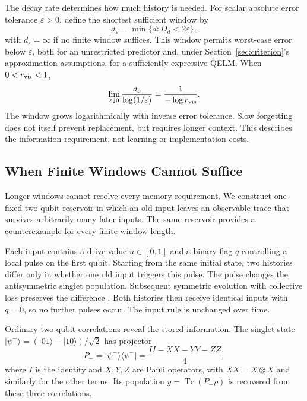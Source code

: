 The decay rate determines how much history is needed. For scalar absolute
error tolerance $\varepsilon>0$, define the shortest sufficient window by
\begin{equation}
 d_\varepsilon=\min\{d:D_d<2\varepsilon\},
 \label{eq:context-length}
\end{equation}
with $d_\varepsilon=\infty$ if no finite window suffices. This window permits
worst-case error below $\varepsilon$, both for an unrestricted predictor
and, under Section~\ref{sec:criterion}'s approximation assumptions, for a
sufficiently expressive QELM. When $0<r_{\rm vis}<1$,
\begin{equation}
 \lim_{\varepsilon\downarrow0}
 \frac{d_\varepsilon}{\log(1/\varepsilon)}
 =\frac{1}{-\log r_{\rm vis}}.
 \label{eq:window-complexity}
\end{equation}
The window grows logarithmically with inverse error tolerance. Slow
forgetting does not itself prevent replacement, but requires longer context.
This describes the information requirement, not learning or implementation
costs.

\subsection{When Finite Windows Cannot Suffice}

Longer windows cannot resolve every memory requirement. We construct one
fixed two-qubit reservoir in which an old input leaves an observable trace
that survives arbitrarily many later inputs. The same reservoir provides
a counterexample for every finite window length.

Each input contains a drive value $u\in[0,1]$ and a binary flag $q$ controlling
a local pulse on the first qubit. Starting from the same initial state,
two histories differ only in whether one old input triggers this pulse.
The pulse changes the antisymmetric singlet population. Subsequent symmetric
evolution with collective loss preserves the difference
\cite{zanardi1997noiseless}. Both histories then receive identical inputs
with $q=0$, so no further pulses occur. The input rule is unchanged over time.

Ordinary two-qubit correlations reveal the stored information. The singlet
state $|\psi^-\rangle=(|01\rangle-|10\rangle)/\sqrt2$ has projector
\begin{equation}
 P_-=|\psi^-\rangle\!\langle\psi^-|
 =\frac{II-XX-YY-ZZ}{4},
 \label{eq:protected-singlet}
\end{equation}
where $I$ is the identity and $X,Y,Z$ are Pauli operators, with
$XX=X\otimes X$ and similarly for the other terms. Its population
$y=\operatorname{Tr}(P_-\rho)$ is recovered from these three correlations.

